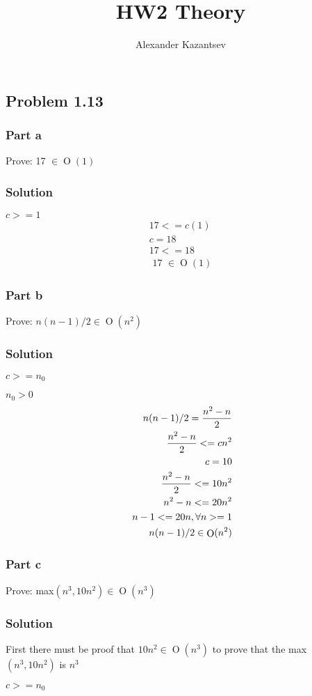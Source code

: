 \documentclass[10pt,letterpaper,oneside]{article}
\title{HW2 Theory}
\author{Alexander Kazantsev}
\newcommand{\Problem}[1]{\subsection*{Problem #1}}
\newcommand{\Part}[1]{\subsubsection*{Part #1}}
\newcommand{\Solution}{\subsubsection*{Solution}}
\DeclareMathOperator{\Omicron}{O}
\newcommand{\BigOh}[1]{\Omicron(#1)}
\begin{document}
\maketitle

\Problem{1.13}

	\Part{a}
	Prove: 17 $\in \BigOh{1}$
	\Solution
		$c>=1$
		\begin{eqnarray*}
			\text{$17 <= c(1)$}\\
			\text{$c=18$}\\
			\text{$17 <= 18$}\\
			\text{ 17 $\in \BigOh{1}$}
		\end{eqnarray*}
	\Part{b}
		Prove: $n(n-1)/2 \in \BigOh{n^2}$
		\Solution
		$c >= n_0$

		$ n_0 > 0$
		\begin{eqnarray*}
			\text{ $n(n-1)/2 =\frac{ n^2-n}{2}$}\\
			\text{ $\frac{ n^2-n}{2}<= cn^2$}\\
			\text{$c=10$}\\
			\text{ $\frac{ n^2-n}{2}<= 10n^2$}\\
			\text{ $ n^2-n<= 20n^2$}\\
			\text{ $ n-1<= 20n$}, \forall n >= 1\\
			\text{ $n(n-1)/2 \in \BigOh{n^2}$}
		\end{eqnarray*}
	\Part{c}
		Prove: max$(n^3,10n^2) \in \BigOh{n^3}$
		\Solution
		First there must be proof that $10n^2 \in \BigOh{n^3}$ to prove that the  max$(n^3,10n^2)$ is $n^3$

		$c >= n_0$
\end{document}
